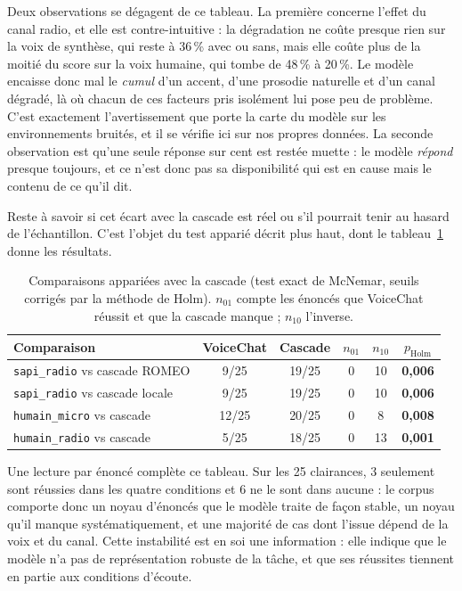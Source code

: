 \documentclass[11pt,a4paper]{article}
\begin{document}
Deux observations se dégagent de ce tableau. La première concerne l'effet du
canal radio, et elle est contre-intuitive : la dégradation ne coûte presque rien
sur la voix de synthèse, qui reste à 36\,\% avec ou sans, mais elle coûte plus
de la moitié du score sur la voix humaine, qui tombe de 48\,\% à 20\,\%. Le
modèle encaisse donc mal le \emph{cumul} d'un accent, d'une prosodie naturelle et
d'un canal dégradé, là où chacun de ces facteurs pris isolément lui pose peu de
problème. C'est exactement l'avertissement que porte la carte du modèle sur les
environnements bruités, et il se vérifie ici sur nos propres données. La seconde
observation est qu'une seule réponse sur cent est restée muette : le modèle
\emph{répond} presque toujours, et ce n'est donc pas sa disponibilité qui est en
cause mais le contenu de ce qu'il dit.

Reste à savoir si cet écart avec la cascade est réel ou s'il pourrait tenir au
hasard de l'échantillon. C'est l'objet du test apparié décrit plus haut, dont le
tableau~\ref{tab:mcnemar} donne les résultats.

\begin{table}[h]
\centering
\caption{Comparaisons appariées avec la cascade (test exact de McNemar, seuils
corrigés par la méthode de Holm). $n_{01}$ compte les énoncés que VoiceChat
réussit et que la cascade manque ; $n_{10}$ l'inverse.}
\label{tab:mcnemar}
\small
\begin{tabular}{@{}lccccc@{}}
\toprule
\textbf{Comparaison} & \textbf{VoiceChat} & \textbf{Cascade} &
$n_{01}$ & $n_{10}$ & $p_{\text{Holm}}$\\
\midrule
\texttt{sapi\_radio} vs cascade ROMEO  & 9/25  & 19/25 & 0 & 10 & \textbf{0,006}\\
\texttt{sapi\_radio} vs cascade locale & 9/25  & 19/25 & 0 & 10 & \textbf{0,006}\\
\texttt{humain\_micro} vs cascade      & 12/25 & 20/25 & 0 & 8  & \textbf{0,008}\\
\texttt{humain\_radio} vs cascade      & 5/25  & 18/25 & 0 & 13 & \textbf{0,001}\\
\bottomrule
\end{tabular}
\end{table}

Une lecture par énoncé complète ce tableau. Sur les 25 clairances, 3 seulement
sont réussies dans les quatre conditions et 6 ne le sont dans aucune : le corpus
comporte donc un noyau d'énoncés que le modèle traite de façon stable, un noyau
qu'il manque systématiquement, et une majorité de cas dont l'issue dépend de la
voix et du canal. Cette instabilité est en soi une information : elle indique que
le modèle n'a pas de représentation robuste de la tâche, et que ses réussites
tiennent en partie aux conditions d'écoute.
\end{document}
